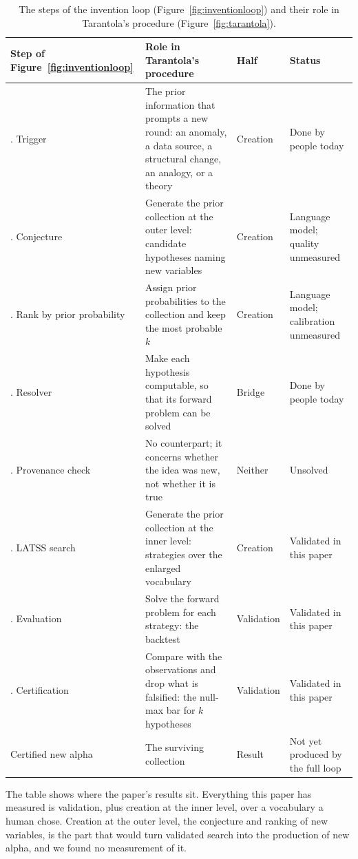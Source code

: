 \documentclass[11pt]{article}
\begin{document}
\begin{table}[htbp]
\centering
\caption{The steps of the invention loop (Figure~\ref{fig:inventionloop}) and their role in Tarantola's
procedure (Figure~\ref{fig:tarantola}).}
\label{tab:fig9tarantola}
\small
\begin{tabular}{>{\raggedright\arraybackslash}p{3.2cm} >{\raggedright\arraybackslash}p{5.0cm}
>{\raggedright\arraybackslash}p{2.0cm} >{\raggedright\arraybackslash}p{3.4cm}}
\toprule
Step of Figure~\ref{fig:inventionloop} & Role in Tarantola's procedure & Half & Status \\
\midrule
1. Trigger & The prior information that prompts a new round: an anomaly, a data source, a structural
change, an analogy, or a theory & Creation & Done by people today \\
\addlinespace
2. Conjecture & Generate the prior collection at the outer level: candidate hypotheses naming new
variables & Creation & Language model; quality unmeasured \\
\addlinespace
3. Rank by prior probability & Assign prior probabilities to the collection and keep the most probable
$k$ & Creation & Language model; calibration unmeasured \\
\addlinespace
4. Resolver & Make each hypothesis computable, so that its forward problem can be solved & Bridge &
Done by people today \\
\addlinespace
5. Provenance check & No counterpart; it concerns whether the idea was new, not whether it is true &
Neither & Unsolved \\
\addlinespace
6. LATSS search & Generate the prior collection at the inner level: strategies over the enlarged
vocabulary & Creation & Validated in this paper \\
\addlinespace
7. Evaluation & Solve the forward problem for each strategy: the backtest & Validation & Validated in
this paper \\
\addlinespace
8. Certification & Compare with the observations and drop what is falsified: the null-max bar for $k$
hypotheses & Validation & Validated in this paper \\
\addlinespace
Certified new alpha & The surviving collection & Result & Not yet produced by the full loop \\
\bottomrule
\end{tabular}
\end{table}

The table shows where the paper's results sit. Everything this paper has measured is validation, plus
creation at the inner level, over a vocabulary a human chose. Creation at the outer level, the
conjecture and ranking of new variables, is the part that would turn validated search into the
production of new alpha, and we found no measurement of it.
\end{document}
